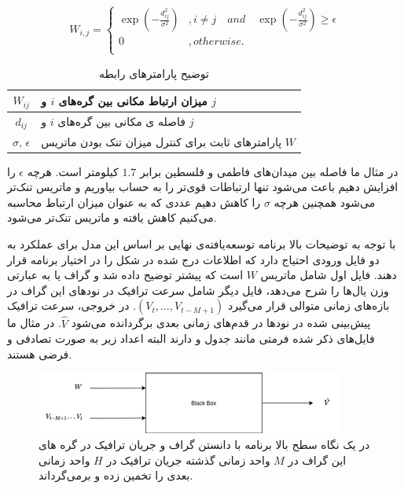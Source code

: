 \documentclass{article}
\begin{document}
\begin{equation}
  W_{i,j} = \left\{
    \begin{array}{ll}
      \exp(-\frac{d^{2}_{ij}}{\sigma^{2}}) & , i \neq j \quad and \quad \exp(-\frac{d^{2}_{ij}}{\sigma^{2}}) \geq \epsilon \\
      0 & , otherwise. \\
    \end{array}\right.
  \label{eq:distance}
\end{equation}

\begin{table}[h]
  \centering
  \caption{توضیح پارامترهای رابطه }
  \begin{tabular}{|c|p{}|}
    \hline
    $W_{ij}$ & میزان ارتباط مکانی بین گره‌های $i$ و $j$ \\
    \hline
    $d_{ij}$ & فاصله ی مکانی بین گره‌های $i$ و $j$ \\
    \hline
    $\sigma$, $\epsilon$ & پارامترهای ثابت برای کنترل میزان تنک{Sparsity} بودن ماتریس $W$ \\
    \hline
  \end{tabular}
  \label{tbl:distance}
\end{table}

در مثال ما فاصله بین میدان‌های فاطمی و فلسطین برابر $1.7$ کیلومتر است.
هرچه $\epsilon$ را افزایش دهیم باعث می‌شود تنها ارتباطات قوی‌تر را به حساب بیاوریم و ماتریس تنک‌تر می‌شود
همچنین هرچه $\sigma$ را کاهش دهیم عددی که به عنوان میزان ارتباط محاسبه می‌کنیم کاهش یافته و ماتریس تنک‌تر می‌شود.

با توجه به توضیحات بالا برنامه توسعه‌یافته‌ی نهایی بر اساس این مدل برای عملکرد به دو فایل ورودی احتیاج دارد که اطلاعات درج شده در شکل  را در اختیار برنامه قرار دهند.
فایل اول شامل ماتریس $W$ است که پیشتر توضیح داده شد و گراف یا به عبارتی وزن یال‌ها را شرح می‌دهد،
فایل دیگر شامل سرعت ترافیک در نودهای این گراف در بازه‌های زمانی متوالی قرار می‌گیرد $(V_{t}, \ldots, V_{t-M+1})$.
در خروجی، سرعت ترافیک پیش‌بینی شده در نودها در قدم‌های زمانی بعدی برگردانده می‌شود $\hat{V}$.
در مثال ما فایل‌های ذکر شده فرمتی مانند جدول  و  دارند البته اعداد زیر به صورت تصادفی و فرضی هستند.

\begin{figure}
  \includegraphics{./images/blackbox.png}
  \centering
  \caption{
در یک نگاه سطح بالا برنامه با دانستن گراف و جریان ترافیک در گره های این گراف در $M$ واحد زمانی گذشته جریان ترافیک در $H$ واحد زمانی بعدی را تخمین زده و برمی‌گرداند.
  }
  \label{fig:blackbox}
\end{figure}
\end{document}
